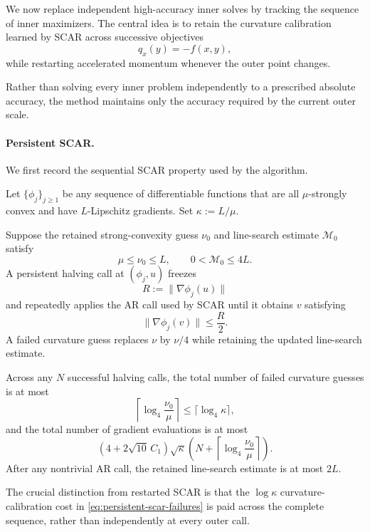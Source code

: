 We now replace independent high-accuracy inner solves by tracking the
sequence of inner maximizers. The central idea is to retain the
curvature calibration learned by SCAR across successive objectives
\[
    q_x(y)=-f(x,y),
\]
while restarting accelerated momentum whenever the outer point
changes.

Rather than solving every inner problem independently to a prescribed
absolute accuracy, the method maintains only the accuracy required by
the current outer scale.


\paragraph{Persistent SCAR.}

We first record the sequential SCAR property used by the algorithm.

\begin{lemma}
\label{lem:scar-persistent-half}
Let $\{\phi_j\}_{j\ge1}$ be any sequence of differentiable functions
that are all $\mu$-strongly convex and have $L$-Lipschitz gradients.
Set $\kappa:=L/\mu$.

Suppose the retained strong-convexity guess $\nu_0$ and line-search
estimate $\mathcal M_0$ satisfy
\[
    \mu\le\nu_0\le L,
    \qquad
    0<\mathcal M_0\le4L.
\]
A persistent halving call at $(\phi_j,u)$ freezes
\[
    R:=\|\nabla\phi_j(u)\|
\]
and repeatedly applies the AR call used by SCAR until it obtains
$v$ satisfying
\[
    \|\nabla\phi_j(v)\|\le\frac R2.
\]
A failed curvature guess replaces $\nu$ by $\nu/4$ while retaining
the updated line-search estimate.

Across any $N$ successful halving calls, the total number of failed
curvature guesses is at most
\begin{equation}
    \left\lceil
        \log_4\frac{\nu_0}{\mu}
    \right\rceil
    \le
    \lceil\log_4\kappa\rceil,
    \label{eq:persistent-scar-failures}
\end{equation}
and the total number of gradient evaluations is at most
\begin{equation}
    (4+2\sqrt{10}\,C_1)
    \sqrt\kappa
    \left(
        N+
        \left\lceil
            \log_4\frac{\nu_0}{\mu}
        \right\rceil
    \right).
    \label{eq:persistent-scar-count}
\end{equation}
After any nontrivial AR call, the retained line-search estimate is at
most $2L$.
\end{lemma}

The crucial distinction from restarted SCAR is that the
$\log\kappa$ curvature-calibration cost in
\eqref{eq:persistent-scar-failures} is paid across the complete
sequence, rather than independently at every outer call.



